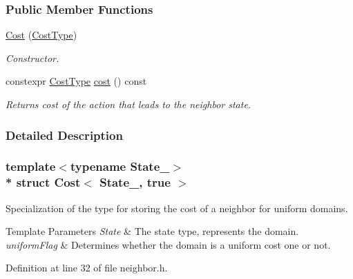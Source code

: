 \subsubsection*{Public Member Functions}
\begin{DoxyCompactItemize}
\item 
\hyperlink{structCost_3_01State___00_01true_01_4_aee8966b40c47cb7ff9037c6f0c89be22}{Cost} (\hyperlink{structCost_3_01State___00_01true_01_4_ab4443fb7dc26647260e82934ca5d928b}{Cost\+Type})\hypertarget{structCost_3_01State___00_01true_01_4_aee8966b40c47cb7ff9037c6f0c89be22}{}\label{structCost_3_01State___00_01true_01_4_aee8966b40c47cb7ff9037c6f0c89be22}

\begin{DoxyCompactList}\small\item\em Constructor. \end{DoxyCompactList}\item 
constexpr \hyperlink{structCost_3_01State___00_01true_01_4_ab4443fb7dc26647260e82934ca5d928b}{Cost\+Type} \hyperlink{structCost_3_01State___00_01true_01_4_a07883d458cf6b240eea51fdeaadcc1d8}{cost} () const 
\begin{DoxyCompactList}\small\item\em Returns cost of the action that leads to the neighbor state. \end{DoxyCompactList}\end{DoxyCompactItemize}


\subsubsection{Detailed Description}
\subsubsection*{template$<$typename State\+\_\+$>$\\*
struct Cost$<$ State\+\_\+, true $>$}

Specialization of the type for storing the cost of a neighbor for uniform domains. 


\begin{DoxyTemplParams}{Template Parameters}
{\em State} & The state type, represents the domain. \\
\hline
{\em uniform\+Flag} & Determines whether the domain is a uniform cost one or not. \\
\hline
\end{DoxyTemplParams}


Definition at line 32 of file neighbor.\+h.



